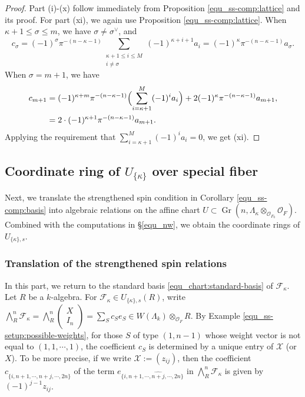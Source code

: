 \documentclass[pdflatex,sn-mathphys-num]{sn-jnl}%
\theoremstyle{thmstyleone}%
\theoremstyle{thmstyletwo}%
\numberwithin{equation}{subsection}
\theoremstyle{thmstylethree}%
\newcommand{\CF}{\ensuremath{\mathcal{F}}\xspace}
\newcommand{\CO}{\ensuremath{\mathcal{O}}\xspace}
\newcommand{\CX}{\ensuremath{\mathcal{X}}\xspace}
\DeclareMathOperator{\Gr}{Gr}
\newcommand{\wh}{\widehat}
\begin{document}
\begin{proof}
Part (i)-(x) follow immediately from Proposition \ref{equ_ss-comp:lattice} and its proof.
For part (xi), we again use Proposition \ref{equ_ss-comp:lattice}.
When $\kappa+1\leq \sigma\leq m$, we have $\sigma\neq \sigma^\vee$, and 
\begin{equation*}
	c_\sigma=(-1)^{\sigma}\pi^{-(n-\kappa-1)}\sum_{\substack{\kappa+1\leq i \leq M \\ i\neq \sigma}} (-1)^{\kappa+i+1} a_i=(-1)^\kappa\pi^{-(n-\kappa-1)}a_\sigma.
\end{equation*}
When $\sigma=m+1$, we have
\begin{align*}
	c_{m+1}={}&(-1)^{\kappa+m}\pi^{-(n-\kappa-1)}\Bigl(\sum_{i=\kappa+1}^M (-1)^i a_i\Bigr)+2(-1)^\kappa\pi^{-(n-\kappa-1)}a_{m+1},\\
	={}&	2\cdot (-1)^{\kappa+1}\pi^{-(n-\kappa-1)}a_{m+1}.
\end{align*}		
Applying the requirement that $\sum_{i=\kappa+1}^{M}(-1)^ia_i= 0$, we get (xi).
\end{proof}
		
		 
\subsection{Coordinate ring of $U_{\{\kappa\}}$ over special fiber}\label{equ_coord}
Next, we translate the strengthened spin condition in Corollary \ref{equ_ss-comp:basis} into algebraic relations on the affine chart $U\subset\Gr(n,\Lambda_\kappa\otimes_{\CO_{F_0}}\CO_F)$. Combined with the computations in \S \ref{equ_nw}, we obtain the coordinate rings of $U_{\{\kappa\},s}$.
		
\subsubsection{Translation of the strengthened spin relations}\label{equ_coord_translation}
In this part, we return to the standard basis \eqref{equ_chart:standard-basis} of $\CF_\kappa$.
Let $R$ be a $k$-algebra. For $\CF_\kappa\in U_{\{\kappa\},s}(R)$, write
$\bigwedge^n_R \mathcal{F}_\kappa=\bigwedge^n_R  \left(\begin{matrix} X\\I_n \end{matrix}\right)=\sum_S c_S e_S\in W(\Lambda_k)\otimes_{\CO_F} R$.
By Example \ref{equ_ss-setup:possible-weights}, for those $S$ of type $(1,n-1)$ whose weight vector is not equal to $(1,1,\cdots,1)$, the coefficient $c_S$ is determined by a unique entry of $\CX$ (or $X$).
To be more precise, if we write $\CX:=(z_{ij})$, then the coefficient $c_{\{i,n+1,\cdots,\wh{n+j},\cdots,2n\}}$ of the term $e_{\{i,n+1,\cdots,\wh{n+j},\cdots,2n\}}$ in $\bigwedge^n_R \mathcal{F}_\kappa$ is given by $(-1)^{j-1}z_{ij}$.
		
\end{document}

